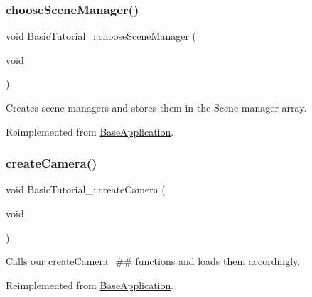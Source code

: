 \subsubsection{\texorpdfstring{choose\+Scene\+Manager()}{chooseSceneManager()}}
{\footnotesize\ttfamily void Basic\+Tutorial\+\_\+::choose\+Scene\+Manager (\begin{DoxyParamCaption}\item[{void}]{ }\end{DoxyParamCaption})\hspace{0.3cm}{\ttfamily [virtual]}}



Creates scene managers and stores them in the Scene manager array. 



 

Reimplemented from \hyperlink{class_base_application}{Base\+Application}.

\mbox{\label{class_basic_tutorial__00_a1bf709417d654dffc2ea10987412b912}} 
\subsubsection{\texorpdfstring{create\+Camera()}{createCamera()}}
{\footnotesize\ttfamily void Basic\+Tutorial\+\_\+::create\+Camera (\begin{DoxyParamCaption}\item[{void}]{ }\end{DoxyParamCaption})\hspace{0.3cm}{\ttfamily [virtual]}}



Calls our create\+Camera\+\_\+\#\# functions and loads them accordingly. 



 

Reimplemented from \hyperlink{class_base_application}{Base\+Application}.

\mbox{\label{class_basic_tutorial__00_a3479c50dbf8dc06a7ea77014eb94c6e7}} 
